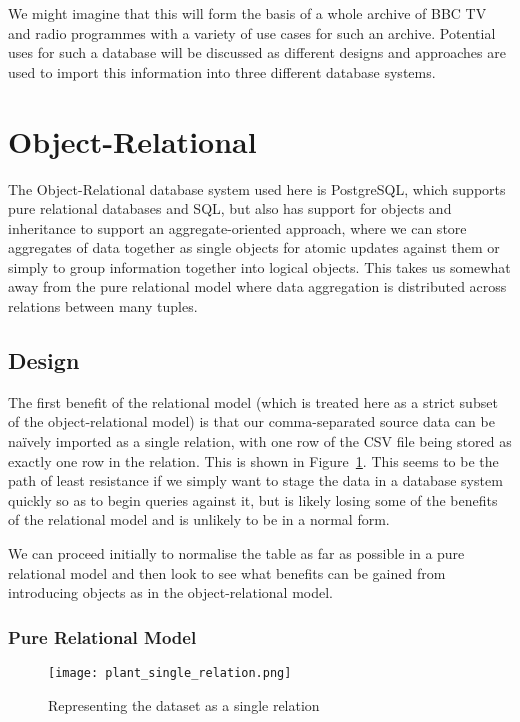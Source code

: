 \documentclass[11pt,a4paper]{article}
\begin{document}
We might imagine that this will form the basis of a whole archive of BBC
TV and radio programmes with a variety of use cases for such an archive.
Potential uses for such a database will be discussed as different designs
and approaches are used to import this information into three different
database systems.

\section{Object-Relational}
\label{sec:postgres}

The Object-Relational database system used here is PostgreSQL, which supports
pure relational databases and SQL, but also has support for objects and
inheritance to support an aggregate-oriented approach, where we can store
aggregates of data together as single objects for atomic updates against
them or simply to group information together into logical objects. This
takes us somewhat away from the pure relational model where data aggregation
is distributed across relations between many tuples. \cite{sadalage2012nosql}

\subsection{Design}

The first benefit of the relational model (which is treated here as a strict
subset of the object-relational model) is that our comma-separated source
data can be na\"ively imported as a single relation, with one row of the CSV
file being stored as exactly one row in the relation. This is shown in
Figure~\ref{fig:single-relation}. This seems
to be the path of least resistance if we simply want to stage the data
in a database system quickly so as to begin queries against it, but is
likely losing some of the benefits of the relational model and is unlikely
to be in a normal form.

We can proceed initially to normalise the table as far as possible in
a pure relational model and then look to see what benefits can be gained
from introducing objects as in the object-relational model.

\subsubsection{Pure Relational Model}

\begin{comment}
  @startuml plant_single_relation.png
  class Programme {
    pid
    start_time
    end_time
    epoch_start
    epoch_end
    complete_title
    media_type
    masterbrand
    service
    brand_pid
    is_clip
    categories
    tags
  }
  @enduml
\end{comment}
\begin{figure}[p]
  \begin{center}
    \texttt{[image: plant\_single\_relation.png]}
  \end{center}
  \caption{Representing the dataset as a single relation}
  \label{fig:single-relation}
\end{figure}
\end{document}
